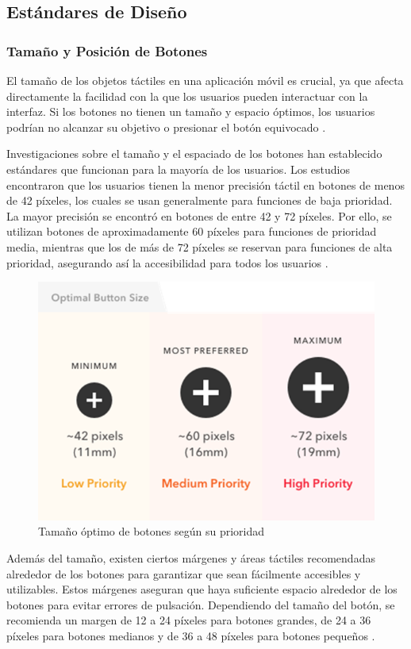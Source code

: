 \subsection{Estándares de Diseño}
\subsubsection{Tamaño y Posición de Botones}
El tamaño de los objetos táctiles en una aplicación móvil es crucial, ya que afecta directamente la facilidad con la que los usuarios pueden interactuar con la interfaz. Si los botones no tienen un tamaño y espacio óptimos, los usuarios podrían no alcanzar su objetivo o presionar el botón equivocado \cite{Bustos2022}.

Investigaciones sobre el tamaño y el espaciado de los botones han establecido estándares que funcionan para la mayoría de los usuarios. Los estudios encontraron que los usuarios tienen la menor precisión táctil en botones de menos de 42 píxeles, los cuales se usan generalmente para funciones de baja prioridad. La mayor precisión se encontró en botones de entre 42 y 72 píxeles. Por ello, se utilizan botones de aproximadamente 60 píxeles para funciones de prioridad media, mientras que los de más de 72 píxeles se reservan para funciones de alta prioridad, asegurando así la accesibilidad para todos los usuarios \cite{Anthony2019}.

\begin{figure}[H]
    \centering
    \includegraphics[width=0.6\linewidth]{figuras/optimal_button_size.png}
    \caption{Tamaño óptimo de botones según su prioridad}
    \label{fig:botones_optimos}
\end{figure}

Además del tamaño, existen ciertos márgenes y áreas táctiles recomendadas alrededor de los botones para garantizar que sean fácilmente accesibles y utilizables. Estos márgenes aseguran que haya suficiente espacio alrededor de los botones para evitar errores de pulsación. Dependiendo del tamaño del botón, se recomienda un margen de 12 a 24 píxeles para botones grandes, de 24 a 36 píxeles para botones medianos y de 36 a 48 píxeles para botones pequeños \cite{Anthony2019}. 

